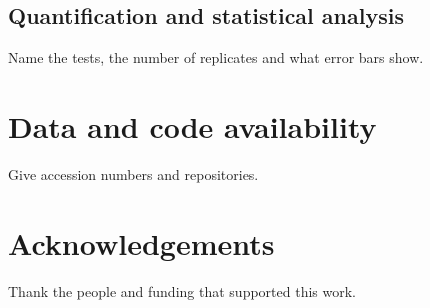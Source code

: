 \documentclass[11pt,a4paper]{article}
\begin{document}
\subsection*{Quantification and statistical analysis}
Name the tests, the number of replicates and what error bars show.

\section*{Data and code availability}
Give accession numbers and repositories.

\section*{Acknowledgements}
Thank the people and funding that supported this work.



\end{document}
